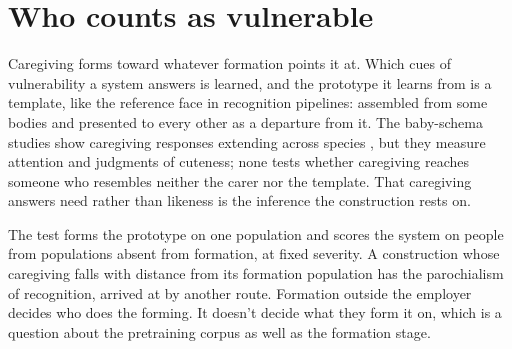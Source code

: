 \section{Who counts as vulnerable}
\label{sec:21.7}
Caregiving forms toward whatever formation points it at. Which cues of vulnerability a system answers is learned, and the prototype it learns from is a template, like the reference face in recognition pipelines: assembled from some bodies and presented to every other as a departure from it. The baby-schema studies show caregiving responses extending across species \autocite{glocker2009baby,borgi2014baby}, but they measure attention and judgments of cuteness; none tests whether caregiving reaches someone who resembles neither the carer nor the template. That caregiving answers need rather than likeness is the inference the construction rests on.

The test forms the prototype on one population and scores the system on people from populations absent from formation, at fixed severity. A construction whose caregiving falls with distance from its formation population has the parochialism of recognition, arrived at by another route. Formation outside the employer decides who does the forming. It doesn't decide what they form it on, which is a question about the pretraining corpus as well as the formation stage.
